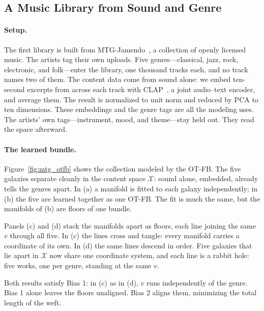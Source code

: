 \subsection{A Music Library from Sound and Genre}
\label{subsec:music_library}

\paragraph{Setup.}
The first library is built from MTG-Jamendo~\citep{Bogdanov2019}, a collection
of openly licensed music. The artists tag their own uploads. Five
genres---classical, jazz, rock, electronic, and folk---enter the library, one
thousand tracks each, and no track names two of them. The content data come from
sound alone: we embed ten-second excerpts from across each track with
CLAP~\citep{Wu2023}, a joint audio--text encoder, and average them. The result
is normalized to unit norm and reduced by PCA to ten dimensions. These
embeddings and the genre tags are all the modeling uses. The artists' own
tags---instrument, mood, and theme---stay held out. They read the space
afterward.

\paragraph{The learned bundle.}
Figure~\ref{fig:mtg_otfb} shows the collection modeled by the OT-FB{}.
The five galaxies separate cleanly in the content space
$\mathcal{X}$: sound alone, embedded, already tells the genres apart.
In (a) a manifold is fitted to each galaxy independently; in (b) the
five are learned together as one OT-FB. The fit is much the same, but
the manifolds of (b) are floors of one bundle.

Panels (c) and (d) stack the manifolds apart as floors, each line
joining the same $v$ through all five. In (c) the lines cross and
tangle: every manifold carries a coordinate of its own. In (d) the
same lines descend in order. Five galaxies that lie apart in
$\mathcal{X}$ now share one coordinate system, and each line is a
rabbit hole: five works, one per genre, standing at the same $v$.

Both results satisfy Bias 1: in (c) as in (d), $v$ runs independently
of the genre. Bias 1 alone leaves the floors unaligned. Bias 2 aligns
them, minimizing the total length of the weft.


